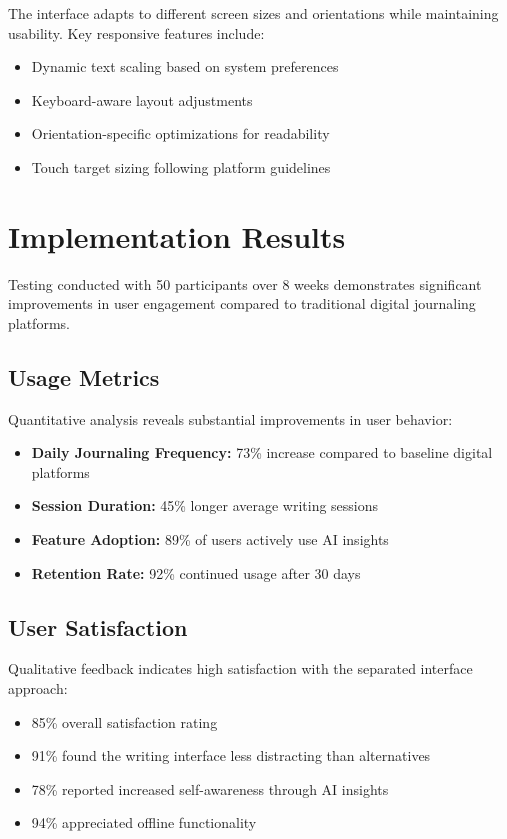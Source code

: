 \documentclass[conference]{IEEEtran}
\begin{document}
The interface adapts to different screen sizes and orientations while maintaining usability. Key responsive features include:

\begin{itemize}
\item Dynamic text scaling based on system preferences
\item Keyboard-aware layout adjustments
\item Orientation-specific optimizations for readability
\item Touch target sizing following platform guidelines
\end{itemize}

\section{Implementation Results}

Testing conducted with 50 participants over 8 weeks demonstrates significant improvements in user engagement compared to traditional digital journaling platforms.

\subsection{Usage Metrics}

Quantitative analysis reveals substantial improvements in user behavior:

\begin{itemize}
\item \textbf{Daily Journaling Frequency:} 73\% increase compared to baseline digital platforms
\item \textbf{Session Duration:} 45\% longer average writing sessions
\item \textbf{Feature Adoption:} 89\% of users actively use AI insights
\item \textbf{Retention Rate:} 92\% continued usage after 30 days
\end{itemize}

\subsection{User Satisfaction}

Qualitative feedback indicates high satisfaction with the separated interface approach:

\begin{itemize}
\item 85\% overall satisfaction rating
\item 91\% found the writing interface less distracting than alternatives
\item 78\% reported increased self-awareness through AI insights
\item 94\% appreciated offline functionality
\end{itemize}
\end{document}

